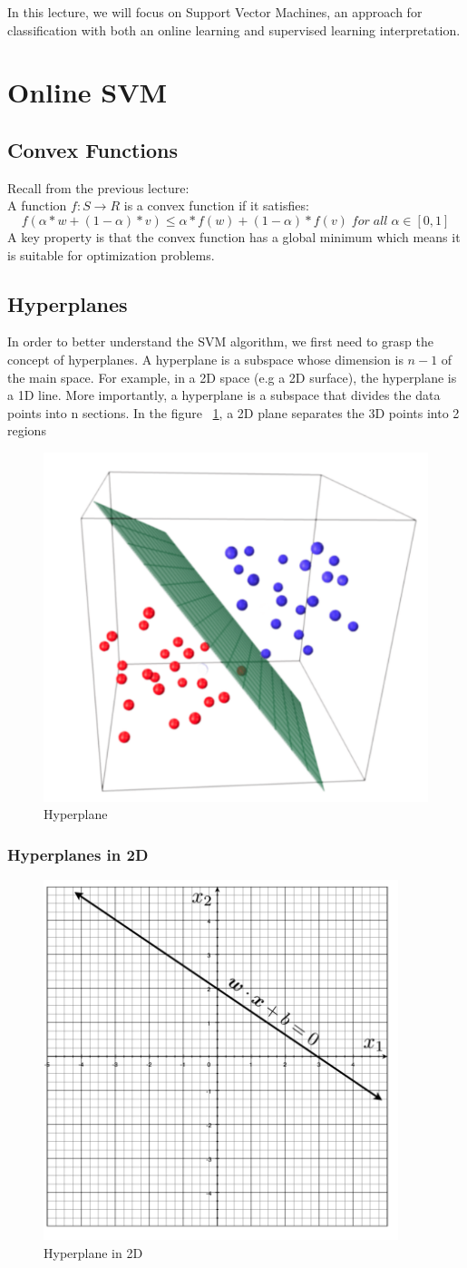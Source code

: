 \documentclass[11pt]{article}
\begin{document}
In this lecture, we will focus on Support Vector Machines, an approach for classification with both an online learning and supervised learning interpretation.


\section{Online SVM}
\subsection{Convex Functions}
Recall from the previous lecture: \\
A function $f:S \rightarrow R$ is a convex function if it satisfies:
$$f(\alpha*w + (1-\alpha)*v) \leq \alpha*f(w) +(1-\alpha)*f(v) \; for \; all \; \alpha \in [0,1] $$
A key property is that the convex function has a global minimum which means it is suitable for optimization problems. 

\subsection{Hyperplanes}
In order to better understand the SVM algorithm, we first need to grasp the concept of hyperplanes. A hyperplane is a subspace whose dimension is $n-1$ of the main space. For example, in a 2D space (e.g a 2D surface), the hyperplane is a 1D line. More importantly, a hyperplane is a subspace that divides the data points into n sections. In the figure ~\ref{fig:sfig1}, a 2D plane separates the 3D points into 2 regions

\begin{figure}[H]
  \centering
  \includegraphics[width=.2\linewidth]{hyperplane.png}
  \caption{Hyperplane}
  \label{fig:sfig1}
\end{figure}

\subsubsection{Hyperplanes in 2D}
\begin{figure}[H]
  \centering
  \includegraphics[width=.3\linewidth]{2Dplane.png}
  \caption{Hyperplane in 2D}
  \label{fig:sfig2}
\end{figure}
\end{document}
